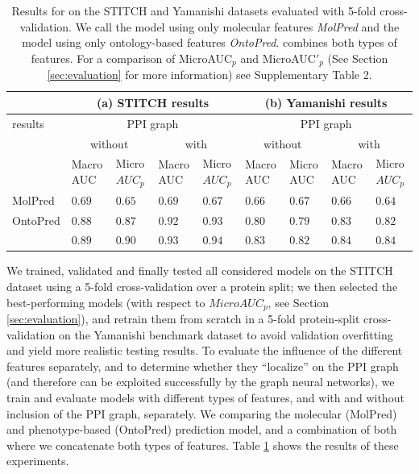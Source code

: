 \documentclass{bioinfo}
\begin{document}
\begin{table}[ht]
  \centering
  \begin{tabular}{|p{1.1cm}|p{0.6cm}|p{0.7cm}|p{0.6cm}|p{0.7cm}|p{0.6cm}|p{0.7cm}|p{0.6cm}|p{0.7cm}|}
    \hline
    &\multicolumn{4}{c|}{(a) STITCH results}& \multicolumn{4}{c|}{(b) Yamanishi results}\\
    \hline
    \name{} results&\multicolumn{4}{c|}{PPI graph}&\multicolumn{4}{c|}{PPI graph}\\
    &\multicolumn{2}{c|}{without}&\multicolumn{2}{c|}{with}&\multicolumn{2}{c|}{without}&\multicolumn{2}{c|}{with}\\
    &Macro AUC&Micro $AUC_p$&Macro AUC&Micro $AUC_p$&Macro AUC&Micro AUC&Macro AUC&Micro $AUC_p$\\
    \hline
    MolPred&$0.69$&$0.65$&$0.69$&$0.67$&$0.66$&$0.67$&$0.66$&$0.64$\\
    \hline
    OntoPred&$0.88$&$0.87$&$0.92$&$0.93$&$0.80$&$0.79$&$0.83$&$0.82$\\
    \hline
    \name{} & $0.89$ & $0.90$&$\mathbf{0.93}$&$\mathbf{0.94}$& $0.83$ & $0.82$&$\mathbf{0.84}$&$\mathbf{0.84}$\\
    \hline
  \end{tabular}
  \caption{\label{tab:Results}Results for \name{} on the STITCH
    and Yamanishi datasets evaluated with 5-fold cross-validation. We 
    call the model using only molecular features
    \textit{MolPred} and the model using only ontology-based
    features \textit{OntoPred}. \name{} combines both types of
    features. For a comparison of MicroAUC$_p$ and MicroAUC$'_p$ (See Section \ref{sec:evaluation} for more information) see Supplementary Table 2. }
\end{table}

We trained, validated and finally tested all considered models on the
STITCH dataset using a 5-fold cross-validation over a protein split;
we then selected the best-performing models (with respect to
$MicroAUC_p$, see Section \ref{sec:evaluation}), and retrain them from
scratch in a 5-fold protein-split cross-validation on the Yamanishi
benchmark dataset to avoid validation overfitting and yield more
realistic testing results. To evaluate the influence of the different
features separately, and to determine whether they ``localize'' on the
PPI graph (and therefore can be exploited successfully by the graph
neural networks), we train and evaluate models with different types of
features, and with and without inclusion of the PPI graph,
separately. We comparing the molecular (MolPred) and phenotype-based
(OntoPred) prediction model, and a combination of both where we
concatenate both types of features. Table \ref{tab:Results} shows the
results of these experiments.
\end{document}
